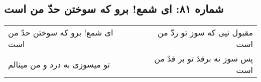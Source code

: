 \begin{center}
\section*{شماره ۸۱: ای شمع! برو که سوختن حدّ من است}
\label{sec:081}
\begin{longtable}{l p{0.5cm} r}
ای شمع! برو که سوختن حدّ من است
&&
مقبول نیی که سوز تو ردّ من است
\\
تو میسوزی به درد و من مینالم
&&
پس سوز نه برقدّ تو بر قدّ من است
\\
\end{longtable}
\end{center}
